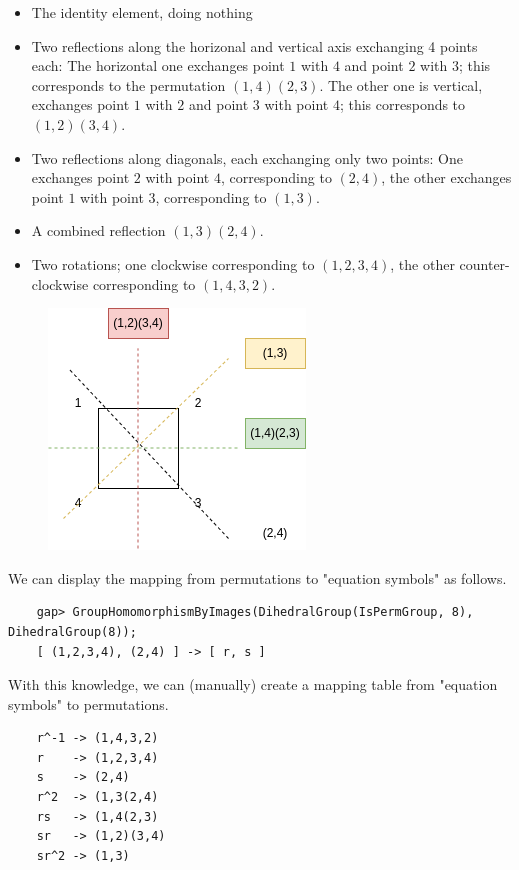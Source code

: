 \begin{itemize}
    \item The identity element, doing nothing
    \item Two reflections along the horizonal and vertical axis exchanging 4 points each: The horizontal one exchanges point $1$ with $4$ and point $2$ with $3$; this corresponds to the permutation $(1,4)(2,3)$. The other one is vertical, exchanges point $1$ with $2$ and point $3$ with point $4$; this corresponds to $(1,2)(3,4)$.
    \item Two reflections along diagonals, each exchanging only two points: One exchanges point $2$ with point $4$, corresponding to $(2,4)$, the other exchanges point $1$ with point $3$, corresponding to $(1,3)$.
    \item A combined reflection $(1,3)(2,4)$.
    \item Two rotations; one clockwise corresponding to $(1,2,3,4)$, the other counter-clockwise corresponding to $(1,4,3,2)$.
\end{itemize}


\begin{figure}[H]
    \centering
    \includegraphics[scale=0.75]{images/2023-06-05_groups_gap_D4_2.png}
\end{figure}

We can display the mapping from permutations to "equation symbols" as follows.

\begin{verbatim}
	gap> GroupHomomorphismByImages(DihedralGroup(IsPermGroup, 8), DihedralGroup(8));
	[ (1,2,3,4), (2,4) ] -> [ r, s ]
\end{verbatim}

With this knowledge, we can (manually) create a mapping table from "equation symbols" to permutations.

\begin{verbatim}
	r^-1 -> (1,4,3,2)
	r    -> (1,2,3,4)
    s    -> (2,4)
    r^2  -> (1,3(2,4)
    rs   -> (1,4(2,3)
	sr   -> (1,2)(3,4)
	sr^2 -> (1,3)
\end{verbatim}

